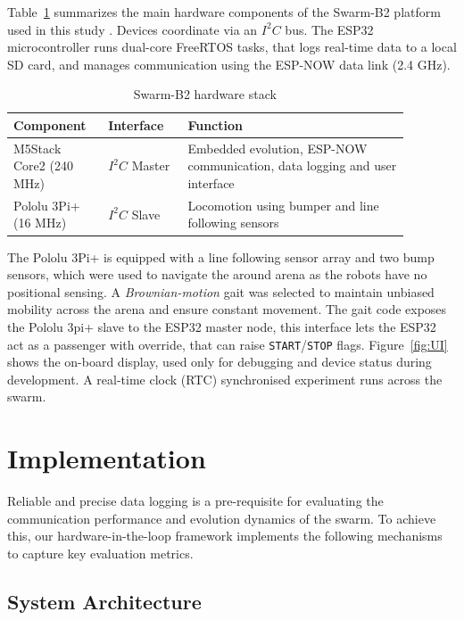 \documentclass[conference]{IEEEtran}
\begin{document}
Table~\ref{tab:B2-hardware} summarizes the main hardware components of the Swarm-B2 platform used in this study \cite{odowd_university_2025}. Devices coordinate via an $I^2C$ bus. The ESP32 microcontroller runs dual-core FreeRTOS tasks, that logs real-time data to a local SD card, and manages communication using the ESP-NOW data link (2.4 GHz). \\

\begin{table}[h]
  \centering
  \caption{Swarm-B2 hardware stack}
  \label{tab:B2-hardware}
  \begin{tabular}{p{0.20\linewidth} p{0.18\linewidth} p{0.50\linewidth}}
    \toprule
    Component & Interface & Function \\
    \midrule
    M5Stack Core2 (240 MHz) & $I^2C$ Master       & Embedded evolution, ESP-NOW communication, data logging and user interface \\
    Pololu 3Pi+ (16 MHz)    & $I^2C$ Slave        & Locomotion using bumper and line following sensors \\
    \bottomrule
  \end{tabular}
\end{table}

The Pololu 3Pi+ is equipped with a line following sensor array and two bump sensors, which were used to navigate the around arena as the robots have no positional sensing. A \emph{Brownian-motion} gait was selected to maintain unbiased mobility across the arena and ensure constant movement. The gait code exposes the Pololu 3pi+ slave to the ESP32 master node, this interface lets the ESP32 act as a passenger with override, that can raise \texttt{START}/\texttt{STOP} flags. Figure~\ref{fig:UI} shows the on-board display, used only for debugging and device status during development. A real-time clock (RTC) synchronised experiment runs across the swarm.

\section{Implementation}\label{sec:implementation}
Reliable and precise data logging is a pre-requisite for evaluating the communication performance and evolution dynamics of the swarm. To achieve this, our hardware-in-the-loop framework implements the following mechanisms to capture key evaluation metrics.

\subsection{System Architecture}\label{sec:architecture}
\end{document}
